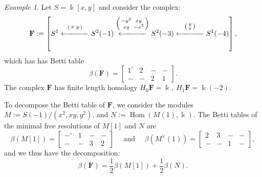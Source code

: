 \documentclass[12pt]{amsart}
\theoremstyle{definition}
\theoremstyle{remark}
\newtheorem{example}[lemma]{Example}
\newcommand{\Hom}{\operatorname{Hom}} %
\newcommand{\kk}{\Bbbk}
\newcommand{\bG}{\mathbf{G}}
\newcommand{\FF}{\mathbf{F}}
\newcommand{\zp}{\circ}
\newcommand{\david}[1]{{\color{red} \sf $\clubsuit\clubsuit\clubsuit$ David: [#1]}}
\begin{document}
\begin{example}
Let $S=\kk[x,y]$ and consider the complex:
\[
\FF := \left[S^1\overset{\left(\begin{smallmatrix}x&y\end{smallmatrix}\right)}{\xlongleftarrow{\hspace*{1.1cm}}} S^2(-1)\overset{\left(\begin{smallmatrix}-y^2&xy\\xy&-x^2\end{smallmatrix}\right)}{\xlongleftarrow{\hspace*{1.1cm}}} S^2(-3)\overset{\left(\begin{smallmatrix}y\\x\end{smallmatrix}\right)}{\xlongleftarrow{\hspace*{1.1cm}}} S^1(-4)\right],
\]
which has has Betti table 
$$
\beta(\FF)=\begin{bmatrix} 1^\circ&2&-&-\\-&-&2&1\end{bmatrix}.
$$
The complex $\FF$ has finite length homology $H_{0}\FF = \kk,\ H_{1}\FF = \kk(-2)$. 

To decompose the Betti table of $\FF$, we consider the
modules $M:=S(-1)/(x^2,xy,y^2)$, and $N:=\Hom(M(1),\kk)$.  The Betti tables of the minimal free resolutions of $M[1]$ and $N$ are
\[
\beta(M[1])=\begin{bmatrix}
-^\zp&1&-&-\\
-&-&3&2
\end{bmatrix}
\quad \text{ and } \quad
\beta(M^\vee(1))=\begin{bmatrix}
2&3&-&-\\
-&-&1&-
\end{bmatrix},
\]
and we thus have the decomposition:
\[
\beta(\FF)=
\frac{1}{2}\beta(M[1])
+
\frac{1}{2}\beta(N).
\]




\end{example}
\end{document}

